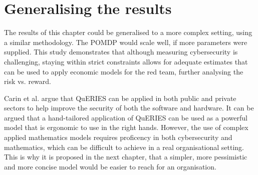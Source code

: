 \section{Generalising the results}

The results of this chapter could be generalised to a more complex
setting, using a similar methodology. The POMDP would scale well, if
more parameters were supplied. This study demonstrates that although
measuring cybersecurity is challenging, staying within strict
constraints allows for adequate estimates that can be used to apply
economic models for the red team, further analysing the risk vs. 
reward.
 
Carin et al. \cite{carin2008cybersecurity} argue that QuERIES can be
applied in both public and private sectors to help improve the
security of both the software and hardware. It can be argued that a hand-tailored
application of QuERIES can be used as a powerful model that is
ergonomic to use in the right hands. However, the use of complex
applied mathematics models requires proficency in both cybersecurity and
mathematics, which can be difficult to achieve in a real organisational
setting. This is why it is proposed in the next chapter, that a simpler, more pessimistic and more concise model would be easier to reach for an
organisation.
